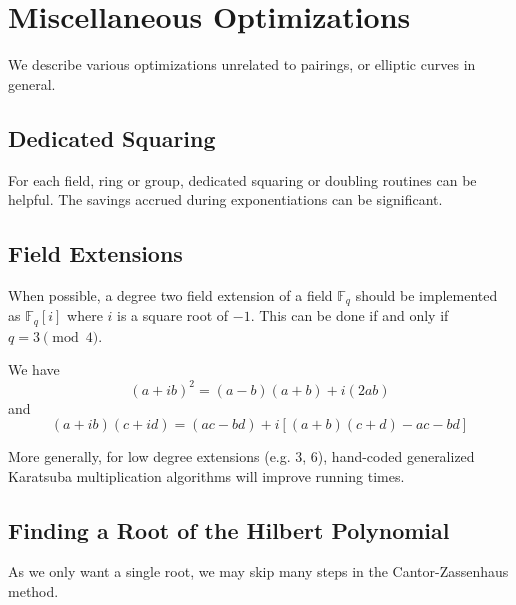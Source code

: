 \chapter{Miscellaneous Optimizations}

We describe various
optimizations unrelated to pairings, or elliptic curves in general.

\section{Dedicated Squaring}

For each field, ring or group, dedicated squaring or doubling routines
can be helpful. The savings accrued during exponentiations can be significant.

\section{Field Extensions}

When possible, a degree two field extension of a field $\mathbb{F}_q$
should be implemented as $\mathbb{F}_q[i]$ where $i$ is a square root of $-1$.
This can be done if and only if $q = 3 \pmod{4}$.

We have
\[ (a + i b)^2 = (a - b)(a + b) + i (2 a b) \]
and
\[ (a + i b)(c + i d) = (ac - bd) + i[(a + b)(c + d) - ac - bd] \]

More generally, for low degree extensions (e.g. 3, 6),
hand-coded generalized Karatsuba multiplication algorithms \cite{wpkaratsuba}
will improve running times.

\section{Finding a Root of the Hilbert Polynomial}

As we only want a single root, we may skip many
steps in the Cantor-Zassenhaus method.
